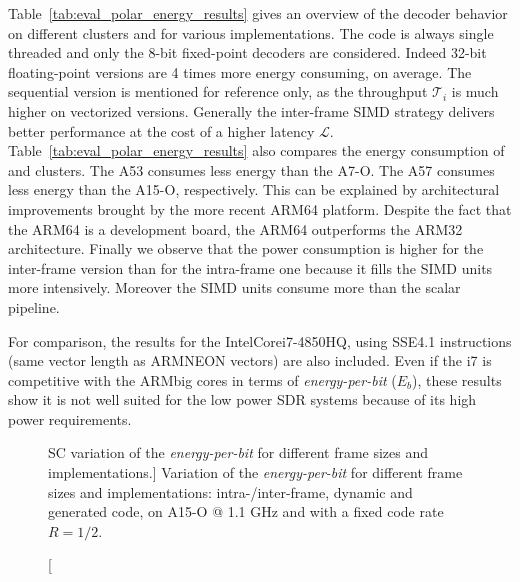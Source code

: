 Table~\ref{tab:eval_polar_energy_results} gives an overview of the decoder
behavior on different clusters and for various implementations. The code is
always single threaded and only the 8-bit fixed-point decoders are considered.
Indeed 32-bit floating-point versions are 4 times more energy consuming, on
average. The sequential version is mentioned for reference only, as the
throughput $\mathcal{T}_i$ is much higher on vectorized versions. Generally the
inter-frame SIMD strategy delivers better performance at the cost of a higher
latency $\mathcal{L}$. Table~\ref{tab:eval_polar_energy_results} also compares
the energy consumption of \little and \bigARM clusters. The A53 consumes less
energy than the A7-O. The A57 consumes less energy than the A15-O, respectively.
This can be explained by architectural improvements brought by the more recent
ARM64 platform. Despite the fact that the ARM64 is a development board, the
ARM64 outperforms the ARM32 architecture. Finally we observe that the power
consumption is higher for the inter-frame version than for the intra-frame one
because it fills the SIMD units more intensively. Moreover the SIMD units
consume more than the scalar pipeline.

For comparison, the results for the Intel\R Core\TM i7-4850HQ, using SSE4.1
instructions (same vector length as ARM\R NEON vectors) are also included. Even
if the i7 is competitive with the ARM\R big cores in terms of
\textit{energy-per-bit} ($E_b$), these results show it is not well suited for
the low power SDR systems because of its high power requirements.

\begin{figure}[htp]
  \centering
  \quad
  \caption
    [SC variation of the \emph{energy-per-bit} for different frame sizes and
    implementations.]
    {Variation of the \emph{energy-per-bit} for different frame sizes and
    implementations: intra-/inter-frame, dynamic and generated code, on A15-O @
    1.1 GHz and with a fixed code rate $R = 1/2$.}
  \label{plot:eval_polar_sc_energy_implems_vs}
\end{figure}

